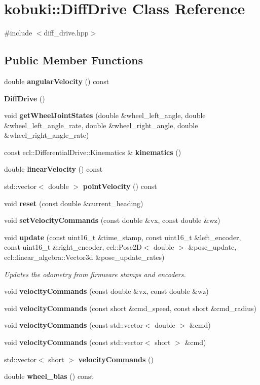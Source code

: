 \section{kobuki\-:\-:\-Diff\-Drive \-Class \-Reference}
\label{classkobuki_1_1DiffDrive}


{\ttfamily \#include $<$diff\-\_\-drive.\-hpp$>$}

\subsection*{\-Public \-Member \-Functions}
\begin{DoxyCompactItemize}
\item 
double {\bf angular\-Velocity} () const 
\item 
{\bf \-Diff\-Drive} ()
\item 
void {\bf get\-Wheel\-Joint\-States} (double \&wheel\-\_\-left\-\_\-angle, double \&wheel\-\_\-left\-\_\-angle\-\_\-rate, double \&wheel\-\_\-right\-\_\-angle, double \&wheel\-\_\-right\-\_\-angle\-\_\-rate)
\item 
const \*
ecl\-::\-Differential\-Drive\-::\-Kinematics \& {\bf kinematics} ()
\item 
double {\bf linear\-Velocity} () const 
\item 
std\-::vector$<$ double $>$ {\bf point\-Velocity} () const 
\item 
void {\bf reset} (const double \&current\-\_\-heading)
\item 
void {\bf set\-Velocity\-Commands} (const double \&vx, const double \&wz)
\item 
void {\bf update} (const uint16\-\_\-t \&time\-\_\-stamp, const uint16\-\_\-t \&left\-\_\-encoder, const uint16\-\_\-t \&right\-\_\-encoder, ecl\-::\-Pose2\-D$<$ double $>$ \&pose\-\_\-update, ecl\-::linear\-\_\-algebra\-::\-Vector3d \&pose\-\_\-update\-\_\-rates)
\begin{DoxyCompactList}\small\item\em \-Updates the odometry from firmware stamps and encoders. \end{DoxyCompactList}\item 
void {\bf velocity\-Commands} (const double \&vx, const double \&wz)
\item 
void {\bf velocity\-Commands} (const short \&cmd\-\_\-speed, const short \&cmd\-\_\-radius)
\item 
void {\bf velocity\-Commands} (const std\-::vector$<$ double $>$ \&cmd)
\item 
void {\bf velocity\-Commands} (const std\-::vector$<$ short $>$ \&cmd)
\item 
std\-::vector$<$ short $>$ {\bf velocity\-Commands} ()
\item 
double {\bf wheel\-\_\-bias} () const 
\end{DoxyCompactItemize}
